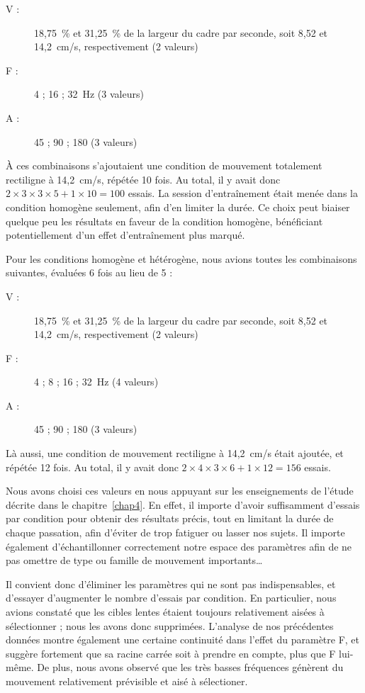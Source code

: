 	\begin{description}
		\item[V :] 18,75~\%{} et 31,25~\%{} de la largeur du cadre par seconde, soit  8,52 et 14,2~cm/s, respectivement (2 valeurs)
		\item[F :] 4 ; 16 ; 32~Hz (3 valeurs)
		\item[A :] 45 ; 90 ; 180\textdegree{} (3 valeurs)
	\end{description}
	
	À ces combinaisons s'ajoutaient une condition de mouvement totalement rectiligne à 14,2~cm/s, répétée 10 fois. Au total, il y avait donc $2\times{}3\times{}3\times{}5+1\times{}10=100$ essais. La session d'entraînement était menée dans la condition homogène seulement, afin d'en limiter la durée. Ce choix peut biaiser quelque peu les résultats en faveur de la condition homogène, bénéficiant potentiellement d'un effet d'entraînement plus marqué.
	
	Pour les conditions homogène et hétérogène, nous avions toutes les combinaisons suivantes, évaluées 6 fois au lieu de 5 :
	
	\begin{description}
		\item[V :] 18,75~\%{} et 31,25~\%{} de la largeur du cadre par seconde, soit  8,52 et 14,2~cm/s, respectivement (2 valeurs)
		\item[F :] 4 ; 8 ; 16 ; 32~Hz (4 valeurs)
		\item[A :] 45 ; 90 ; 180\textdegree{} (3 valeurs)
	\end{description}
	
	Là aussi, une condition de mouvement rectiligne à 14,2~cm/s était ajoutée, et répétée 12 fois. Au total, il y avait donc $2\times{}4\times{}3\times{}6+1\times{}12=156$ essais.
	
	Nous avons choisi ces valeurs en nous appuyant sur les enseignements de l'étude décrite dans le chapitre~\ref{chap4}. En effet, il importe d'avoir suffisamment d'essais par condition pour obtenir des résultats précis, tout en limitant la durée de chaque passation, afin d'éviter de trop fatiguer ou lasser nos sujets. Il importe également d'échantillonner correctement notre espace des paramètres afin de ne pas omettre de \og type \fg{} ou \og famille \fg{} de mouvement importants\ldots{}
	
	Il convient donc d'éliminer les paramètres qui ne sont pas indispensables, et d'essayer d'augmenter le nombre d'essais par condition. En particulier, nous avions constaté que les cibles lentes étaient toujours relativement aisées à sélectionner ; nous les avons donc supprimées. L'analyse de nos précédentes données montre également une certaine continuité dans l'effet du paramètre F, et suggère fortement que sa racine carrée soit à prendre en compte, plus que F lui-même. De plus, nous avons observé que les très basses fréquences génèrent du mouvement relativement prévisible et aisé à sélectioner.
	
